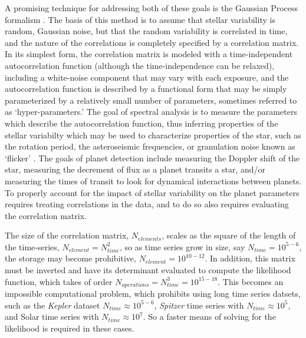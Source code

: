 \documentclass[manuscript, letterpaper]{aastex6}
\begin{document}
A promising technique for addressing both of these goals is the Gaussian Process formalism 
\citep{Rasmussen2006,Gibson2012}.  The basis of this method is to assume that stellar variability
is random, Gaussian noise, but that the random variability is correlated in time, and the nature of the
correlations is completely specified by a correlation matrix.  In its simplest form, the 
correlation matrix is modeled with a time-independent autocorrelation function (although 
the time-independence can be relaxed), including a white-noise component that may vary
with each exposure, and the autocorrelation function is described by a functional form that may be 
simply parameterized by a relatively small number of parameters, sometimes referred to as 
`hyper-parameters.'  The goal of spectral analysis is to measure the parameters which
describe the autocorrelation function, thus inferring properties of the stellar variabilty
which may be used to characterize properties of the star, such as the rotation period,
the asteroseismic frequencies, or granulation noise known as `flicker' \citep{Aerts2010,Noyes1984,Bastien2013}.
The goals of planet detection include measuring the Doppler shift of the star, measuring
the decrement of flux as a planet transits a star, and/or measuring the times of transit to
look for dynamical interactions between planets.  To properly account for the impact of 
stellar variability on the planet parameters requires treating correlations in the data, and 
to do so also requires evaluating the correlation matrix.  

The size of the correlation matrix, $N_{elements}$, scales as the square of the length of the time-series,
$N_{element}=N_{time}^2$, so as time series grow in size, say $N_{time} =10^{5-6}$, the storage may become 
prohibitive, $N_{element} = 10^{10-12}$.  In addition, this matrix must be inverted and have
its determinant evaluated to compute the likelihood function, which takes of order $N_{operations}
= N_{time}^3 = 10^{15-18}$.  This becomes an impossible computational problem, which prohibits
using long time series datsets, such as the {\it Kepler} dataset $N_{time} \approx 10^{5-6}$,
{\it Spitzer} time series with $N_{time} \approx 10^5$, and Solar time series with
$N_{time} \approx 10^7$.  So a faster means of solving for the likelihood is required in these
cases.
\end{document}
